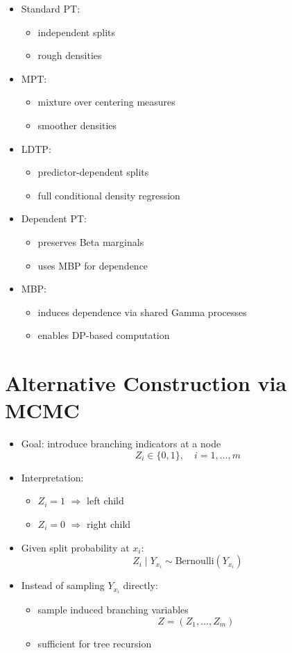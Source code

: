 \documentclass[12pt,oneside]{book}
\numberwithin{equation}{section}
\theoremstyle{definition}
\theoremstyle{plain}
\theoremstyle{remark}
\begin{document}
\begin{itemize}
\item Standard PT:
\begin{itemize}
\item independent splits
\item rough densities
\end{itemize}

\item MPT:
\begin{itemize}
\item mixture over centering measures
\item smoother densities
\end{itemize}

\item LDTP:
\begin{itemize}
\item predictor-dependent splits
\item full conditional density regression
\end{itemize}

\item Dependent PT:
\begin{itemize}
\item preserves Beta marginals
\item uses MBP for dependence
\end{itemize}

\item MBP:
\begin{itemize}
\item induces dependence via shared Gamma processes
\item enables DP-based computation
\end{itemize}
\end{itemize}

\section{Alternative Construction via MCMC}

\begin{itemize}
\item Goal: introduce branching indicators at a node
\[
Z_i \in \{0,1\}, \quad i=1,\dots,m
\]

\item Interpretation:
\begin{itemize}
\item $Z_i = 1$ $\Rightarrow$ left child
\item $Z_i = 0$ $\Rightarrow$ right child
\end{itemize}

\item Given split probability at $x_i$:
\[
Z_i \mid Y_{x_i} \sim \text{Bernoulli}(Y_{x_i})
\]

\item Instead of sampling $Y_{x_i}$ directly:
\begin{itemize}
\item sample induced branching variables
\[
Z = (Z_1,\dots,Z_m)
\]
\item sufficient for tree recursion
\end{itemize}
\end{itemize}
\end{document}
